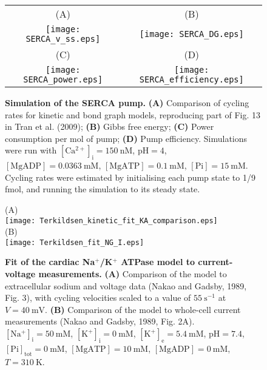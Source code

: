 \documentclass[11pt]{article}
\begin{document}
\begin{figure}
	\centering
	\begin{tabular}{c c}
		(A) & (B) \\
		\texttt{[image: SERCA\_v\_ss.eps]} & 
		\texttt{[image: SERCA\_DG.eps]} \\
		(C) & (D) \\
		\texttt{[image: SERCA\_power.eps]} & 
		\texttt{[image: SERCA\_efficiency.eps]}
	\end{tabular}
	\caption{\textbf{Simulation of the SERCA pump.} \textbf{(A)} Comparison of cycling rates for kinetic and bond graph models, reproducing part of Fig. 13 in Tran et al. (2009); \textbf{(B)} Gibbs free energy; \textbf{(C)} Power consumption per mol of pump; \textbf{(D)} Pump efficiency. Simulations were run with $\mathrm{[Ca^{2+}]_i = 150 \ nM}$, $\mathrm{pH = 4}$, $\mathrm{[MgADP] = 0.0363 \ mM}$, $\mathrm{[MgATP] = 0.1 \ mM}$, $\mathrm{[Pi] = 15 \ mM}$. Cycling rates were estimated by initialising each pump state to 1/9 fmol, and running the simulation to its steady state.}
\end{figure}

\begin{figure}
	\centering
	(A) \\
	\texttt{[image: Terkildsen\_kinetic\_fit\_KA\_comparison.eps]} \\
	(B) \\
	\texttt{[image: Terkildsen\_fit\_NG\_I.eps]}
	\caption{\textbf{Fit of the cardiac Na$^+$/K$^+$ ATPase model to current-voltage measurements.} \textbf{(A)} Comparison of the model to extracellular sodium and voltage data (Nakao and Gadsby, 1989, Fig. 3), with cycling velocities scaled to a value of $55 \ \mathrm{s^{-1}}$ at $V = 40 \ \mathrm{mV}$. \textbf{(B)} Comparison of the model to whole-cell current measurements  (Nakao and Gadsby, 1989, Fig. 2A).  $\mathrm{[Na^+]_i} = 50\ \mathrm{mM}$, $\mathrm{[K^+]_i} = 0\ \mathrm{mM}$, $\mathrm{[K^+]_e} = 5.4\ \mathrm{mM}$, $\mathrm{pH} = 7.4$, $\mathrm{[Pi]_{tot}} = 0\ \mathrm{mM}$, $\mathrm{[MgATP]} = 10\ \mathrm{mM}$, $\mathrm{[MgADP]} = 0\ \mathrm{mM}$, $T = 310\ \mathrm{K}$.} 
\end{figure}
\end{document}

